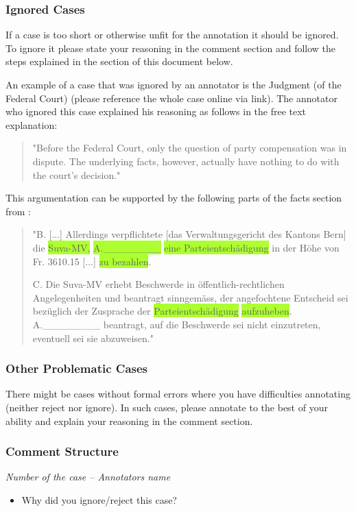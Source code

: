 \documentclass{article}
\begin{document}
\subsubsection{Ignored Cases}
If a case is too short or otherwise unfit for the annotation it should be ignored. To ignore it please state your reasoning in the comment section and follow the steps explained in the  section of this document below. 

An example of a case that was ignored by an annotator is the Judgment (of the Federal Court) \citeauthor{8C-641-2019} (please reference the whole case online via link). The annotator who ignored this case explained his reasoning as follows in the free text explanation: 
\begin{quote}
"Before the Federal Court, only the question of party compensation was in dispute. The underlying facts, however, actually have nothing to do with the court's decision."
\end{quote}
This argumentation can be supported by the following parts of the facts section from \citeauthor{8C-641-2019}:
\begin{quote}
"B. [...] Allerdings verpflichtete [das Verwaltungsgericht des Kantons Bern] die \colorbox{GreenYellow}{Suva-MV,} \colorbox{GreenYellow}{A.\_\_\_\_\_\_\_\_} \colorbox{GreenYellow}{eine Parteientschädigung} in der Höhe
von Fr. 3610.15 [...]  \colorbox{GreenYellow}{zu bezahlen}.

C. Die Suva-MV erhebt Beschwerde in öffentlich-rechtlichen Angelegenheiten und beantragt sinngemäss, der angefochtene Entscheid sei bezüglich der Zusprache der \colorbox{GreenYellow}{Parteientschädigung} \colorbox{GreenYellow}{aufzuheben}.
A.\_\_\_\_\_\_\_\_ beantragt, auf die Beschwerde sei nicht einzutreten, eventuell sei sie abzuweisen."
\end{quote}
\subsubsection{Other Problematic Cases}
There might be cases without formal errors where you have difficulties annotating (neither reject nor ignore). In such cases, please annotate to the best of your ability and explain your reasoning in the comment section.
\pagebreak
\subsubsection{Comment Structure}
\begin{mdframed}[frametitle={Comment for rejecting and ignoring case}]
\emph{Number of the case – Annotators name}

\begin{itemize}
	\item Why did you ignore/reject this case?
\end{itemize}	
\end{mdframed}
\end{document}
